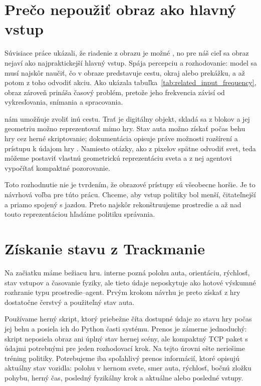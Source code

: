 \section{Prečo nepoužiť obraz ako hlavný vstup}

Súvisiace práce ukázali, že riadenie z obrazu je možné \cite{bojarski2016endtoend}, no pre náš cieľ sa obraz nejaví ako najpraktickejší hlavný vstup. Spája percepciu a rozhodovanie: model sa musí najskôr naučiť, čo v obraze predstavuje cestu, okraj alebo prekážku, a až potom z toho odvodiť akciu. Ako ukázala tabuľka~\ref{tab:related_input_frequency}, obraz zároveň prináša časový problém, pretože jeho frekvencia závisí od vykresľovania, snímania a spracovania.

\Trackmania{} nám umožňuje zvoliť inú cestu. Trať je digitálny objekt, skladá sa z blokov a jej geometriu možno reprezentovať mimo hry. Stav auta možno získať počas behu hry cez herné skriptovanie; dokumentácia \OpenPlanet{} opisuje práve možnosti rozšírení a prístupu k údajom hry \cite{openplanet_wiki2026}. Namiesto otázky, ako z pixelov spätne odvodiť svet, teda môžeme postaviť vlastnú geometrickú reprezentáciu sveta a z nej agentovi vypočítať kompaktné pozorovanie.

Toto rozhodnutie nie je tvrdením, že obrazové prístupy sú všeobecne horšie. Je to návrhová voľba pre túto prácu. Chceme, aby vstup politiky bol menší, čitateľnejší a priamo spojený s jazdou. Preto najskôr rekonštruujeme prostredie a až nad touto reprezentáciou hľadáme politiku správania.

\section{Získanie stavu z Trackmanie}

Na začiatku máme bežiacu hru. \Trackmania{} interne pozná polohu auta, orientáciu, rýchlosť, stav vstupov a časovanie fyziky, ale tieto údaje neposkytuje ako hotové výskumné rozhranie typu prostredie--agent. Prvým krokom návrhu je preto získať z hry dostatočne čerstvý a použiteľný stav auta.

Používame herný skript, ktorý priebežne číta dostupné údaje zo stavu hry počas jej behu a posiela ich do Python časti systému. Prenos je zámerne jednoduchý: skript neposiela obraz ani úplný stav hernej scény, ale kompaktný TCP paket s údajmi potrebnými pre jeden rozhodovací krok. Na tejto úrovni ešte neriešime tréning politiky. Potrebujeme iba spoľahlivý prenos informácií, ktoré opisujú aktuálny stav vozidla: polohu v hernom svete, smer auta, rýchlosť, bočnú zložku pohybu, herný čas, posledný fyzikálny krok a aktuálne alebo posledné vstupy.

